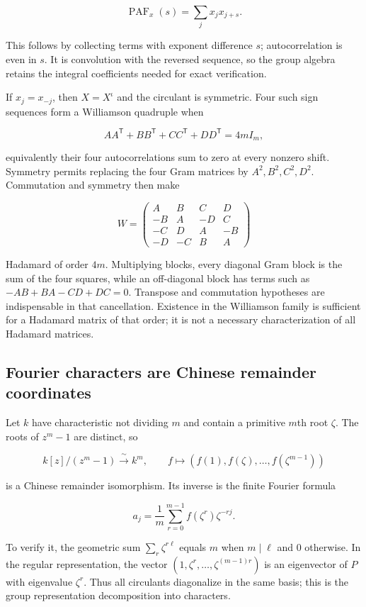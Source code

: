\documentclass[
  11pt,
]{article}
\begin{document}
\[\operatorname{PAF}_x(s)=\sum_jx_jx_{j+s}.\]

This follows by collecting terms with exponent difference \(s\);
autocorrelation is even in \(s\). It is convolution with the reversed
sequence, so the group algebra retains the integral coefficients needed
for exact verification.

If \(x_j=x_{-j}\), then \(X=X^\iota\) and the circulant is symmetric.
Four such sign sequences form a Williamson quadruple when

\[AA^{\mathsf T}+BB^{\mathsf T}+CC^{\mathsf T}+DD^{\mathsf T}
=4mI_m,\]

equivalently their four autocorrelations sum to zero at every nonzero
shift. Symmetry permits replacing the four Gram matrices by
\(A^2,B^2,C^2,D^2\). Commutation and symmetry then make

\[W=\begin{pmatrix}
A&B&C&D\\-B&A&-D&C\\-C&D&A&-B\\-D&-C&B&A
\end{pmatrix}\]

Hadamard of order \(4m\). Multiplying blocks, every diagonal Gram block
is the sum of the four squares, while an off-diagonal block has terms
such as \(-AB+BA-CD+DC=0\). Transpose and commutation hypotheses are
indispensable in that cancellation. Existence in the Williamson family
is sufficient for a Hadamard matrix of that order; it is not a necessary
characterization of all Hadamard matrices.

\subsection{Fourier characters are Chinese remainder
coordinates}\label{fourier-characters-are-chinese-remainder-coordinates}

Let \(k\) have characteristic not dividing \(m\) and contain a primitive
\(m\)th root \(\zeta\). The roots of \(z^m-1\) are distinct, so

\[k[z]/(z^m-1)\xrightarrow{\ \sim\ }k^m,
\qquad f\longmapsto(f(1),f(\zeta),\ldots,f(\zeta^{m-1}))\]

is a Chinese remainder isomorphism. Its inverse is the finite Fourier
formula

\[a_j=\frac1m\sum_{r=0}^{m-1}f(\zeta^r)\zeta^{-rj}.\]

To verify it, the geometric sum \(\sum_r\zeta^{r\ell}\) equals \(m\)
when \(m\mid\ell\) and \(0\) otherwise. In the regular representation,
the vector \((1,\zeta^r,\ldots,\zeta^{(m-1)r})\) is an eigenvector of
\(P\) with eigenvalue \(\zeta^r\). Thus all circulants diagonalize in
the same basis; this is the group representation decomposition into
characters.
\end{document}

